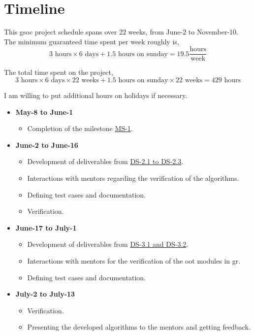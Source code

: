 \section{Timeline}

This \acs{gsoc} project schedule spans over 22 weeks, from June-2 to November-10. The minimum guaranteed time spent per week roughly is,
$$ 3 \text{ hours} \times 6 \text{ days} + 1.5 \text{ hours on sunday} = 19.5 \frac{\text{hours}}{\text{week}}$$

The total time spent on the project,
$$ 3 \text{ hours} \times 6 \text{ days} \times 22 \text{ weeks} + 1.5 \text{ hours on sunday} \times 22 \text{ weeks} = 429 \text{ hours}$$

I am willing to put additional hours on holidays if necessary.

\begin{itemize}
	\item \textbf{May-8 to June-1}
	\begin{itemize}
		\item Completion of the milestone \hyperref[sec: milestones]{MS-1}.
	\end{itemize}
	\item \textbf{June-2 to June-16}
	\begin{itemize}
		\item Development of deliverables from \hyperref[sec: deliverables]{DS-2.1 to DS-2.3}.
		\item Interactions with mentors regarding the verification of the algorithms.
		\item Defining test cases and documentation.
		\item Verification.
	\end{itemize}
	\item \textbf{June-17 to July-1}
	\begin{itemize}
		\item Development of deliverables from \hyperref[sec: deliverables]{DS-3.1 and DS-3.2}.
		\item Interactions with mentors for the verification of the \ac{oot} modules in \ac{gr}.
		\item Defining test cases and documentation.
	\end{itemize}
	\item \textbf{July-2 to July-13}
	\begin{itemize}
		\item Verification.
		\item Presenting the developed algorithms to the mentors and getting feedback.

\end{itemize}
\end{itemize}
